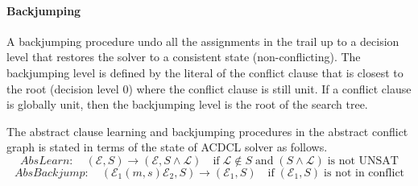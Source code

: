 \paragraph {\textbf{Backjumping}}
A backjumping procedure undo all the assignments in the trail up to 
a decision level that restores the solver to a consistent state 
(non-conflicting).  The backjumping level is defined by the literal 
of the conflict clause that is closest to the root (decision level 0) 
where the conflict clause is still unit. If a conflict clause is 
globally unit, then the backjumping level is the root of the search tree.

The abstract clause learning and backjumping procedures in the abstract 
conflict graph is stated in terms of the state of ACDCL solver as follows. 
\[AbsLearn: \quad  (\mathcal{E},S) \rightarrow (\mathcal{E},S \wedge
\mathcal{L}) \quad \text{if} \; \mathcal{L} \notin S \; \textrm{and}
\; (S \wedge \mathcal{L}) \; \text{is not UNSAT} \]
\[AbsBackjump: \quad (\mathcal{E}_1(m,s)\mathcal{E}_2,S) \rightarrow
(\mathcal{E}_1,S) \quad \text{if} \; (\mathcal{E}_1,S) \; \text{is not in conflict} \]   

